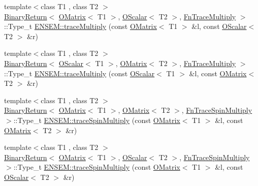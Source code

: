 \begin{DoxyCompactItemize}
\item 
{\footnotesize template$<$class T1 , class T2 $>$ }\\\mbox{\hyperlink{structENSEM_1_1BinaryReturn}{Binary\+Return}}$<$ \mbox{\hyperlink{classENSEM_1_1OMatrix}{O\+Matrix}}$<$ T1 $>$, \mbox{\hyperlink{classENSEM_1_1OScalar}{O\+Scalar}}$<$ T2 $>$, \mbox{\hyperlink{structENSEM_1_1FnTraceMultiply}{Fn\+Trace\+Multiply}} $>$\+::Type\+\_\+t \mbox{\hyperlink{group__obsmatrix_ga465cbe792dfb205b829f653853253e8f}{E\+N\+S\+E\+M\+::trace\+Multiply}} (const \mbox{\hyperlink{classENSEM_1_1OMatrix}{O\+Matrix}}$<$ T1 $>$ \&l, const \mbox{\hyperlink{classENSEM_1_1OScalar}{O\+Scalar}}$<$ T2 $>$ \&r)
\item 
{\footnotesize template$<$class T1 , class T2 $>$ }\\\mbox{\hyperlink{structENSEM_1_1BinaryReturn}{Binary\+Return}}$<$ \mbox{\hyperlink{classENSEM_1_1OScalar}{O\+Scalar}}$<$ T1 $>$, \mbox{\hyperlink{classENSEM_1_1OMatrix}{O\+Matrix}}$<$ T2 $>$, \mbox{\hyperlink{structENSEM_1_1FnTraceMultiply}{Fn\+Trace\+Multiply}} $>$\+::Type\+\_\+t \mbox{\hyperlink{group__obsmatrix_gab9e4e0bccae4aa80554908fd966782e1}{E\+N\+S\+E\+M\+::trace\+Multiply}} (const \mbox{\hyperlink{classENSEM_1_1OScalar}{O\+Scalar}}$<$ T1 $>$ \&l, const \mbox{\hyperlink{classENSEM_1_1OMatrix}{O\+Matrix}}$<$ T2 $>$ \&r)
\item 
{\footnotesize template$<$class T1 , class T2 $>$ }\\\mbox{\hyperlink{structENSEM_1_1BinaryReturn}{Binary\+Return}}$<$ \mbox{\hyperlink{classENSEM_1_1OMatrix}{O\+Matrix}}$<$ T1 $>$, \mbox{\hyperlink{classENSEM_1_1OMatrix}{O\+Matrix}}$<$ T2 $>$, \mbox{\hyperlink{structENSEM_1_1FnTraceSpinMultiply}{Fn\+Trace\+Spin\+Multiply}} $>$\+::Type\+\_\+t \mbox{\hyperlink{group__obsmatrix_gabff96ae04e02659ddc78f25a8d61bf61}{E\+N\+S\+E\+M\+::trace\+Spin\+Multiply}} (const \mbox{\hyperlink{classENSEM_1_1OMatrix}{O\+Matrix}}$<$ T1 $>$ \&l, const \mbox{\hyperlink{classENSEM_1_1OMatrix}{O\+Matrix}}$<$ T2 $>$ \&r)
\item 
{\footnotesize template$<$class T1 , class T2 $>$ }\\\mbox{\hyperlink{structENSEM_1_1BinaryReturn}{Binary\+Return}}$<$ \mbox{\hyperlink{classENSEM_1_1OMatrix}{O\+Matrix}}$<$ T1 $>$, \mbox{\hyperlink{classENSEM_1_1OScalar}{O\+Scalar}}$<$ T2 $>$, \mbox{\hyperlink{structENSEM_1_1FnTraceSpinMultiply}{Fn\+Trace\+Spin\+Multiply}} $>$\+::Type\+\_\+t \mbox{\hyperlink{group__obsmatrix_gaff573e35e3b3904f735317f67cae28f6}{E\+N\+S\+E\+M\+::trace\+Spin\+Multiply}} (const \mbox{\hyperlink{classENSEM_1_1OMatrix}{O\+Matrix}}$<$ T1 $>$ \&l, const \mbox{\hyperlink{classENSEM_1_1OScalar}{O\+Scalar}}$<$ T2 $>$ \&r)

\end{DoxyCompactItemize}

